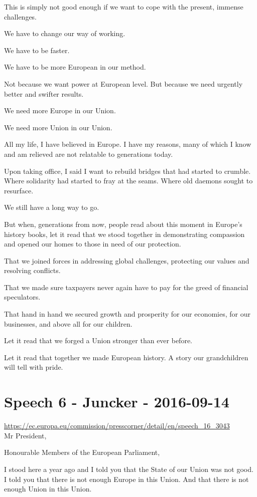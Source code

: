 \documentclass[a4paper,11pt]{article}
\begin{document}
This is simply not good enough if we want to cope with the present, immense challenges.

We have to change our way of working.

We have to be faster.

We have to be more European in our method.

Not because we want power at European level. But because we need urgently better and swifter results.

We need more Europe in our Union.

We need more Union in our Union.

All my life, I have believed in Europe. I have my reasons, many of which I know and am relieved are not relatable to generations today.

Upon taking office, I said I want to rebuild bridges that had started to crumble. Where solidarity had started to fray at the seams. Where old daemons sought to resurface.

We still have a long way to go.

But when, generations from now, people read about this moment in Europe's history books, let it read that we stood together in demonstrating compassion and opened our homes to those in need of our protection.

That we joined forces in addressing global challenges, protecting our values and resolving conflicts.

That we made sure taxpayers never again have to pay for the greed of financial speculators.

That hand in hand we secured growth and prosperity for our economies, for our businesses, and above all for our children.

Let it read that we forged a Union stronger than ever before.

Let it read that together we made European history. A story our grandchildren will tell with pride.
 \newpage\section{Speech 6 - Juncker - 2016-09-14}
\url{https://ec.europa.eu/commission/presscorner/detail/en/speech_16_3043}\\[3mm]
Mr President,

Honourable Members of the European Parliament,

I stood here a year ago and I told you that the State of our Union was not good. I told you that there is not enough Europe in this Union. And that there is not enough Union in this Union.
\end{document}
